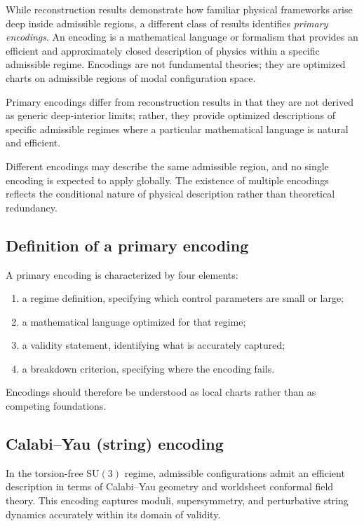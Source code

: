 \documentclass[11pt]{article}
\begin{document}
While reconstruction results demonstrate how familiar physical frameworks arise deep inside admissible regions, a different class of results identifies \emph{primary encodings}. An encoding is a mathematical language or formalism that provides an efficient and approximately closed description of physics within a specific admissible regime. Encodings are not fundamental theories; they are optimized charts on admissible regions of modal configuration space.

Primary encodings differ from reconstruction results in that they are not derived as generic deep-interior limits;
rather, they provide optimized descriptions of specific admissible regimes where a particular mathematical language
is natural and efficient.


Different encodings may describe the same admissible region, and no single encoding is expected to apply globally. The existence of multiple encodings reflects the conditional nature of physical description rather than theoretical redundancy.

\subsection{Definition of a primary encoding}

A primary encoding is characterized by four elements:
\begin{enumerate}
\item a regime definition, specifying which control parameters are small or large;
\item a mathematical language optimized for that regime;
\item a validity statement, identifying what is accurately captured;
\item a breakdown criterion, specifying where the encoding fails.
\end{enumerate}

Encodings should therefore be understood as local charts rather than as competing foundations.

\subsection{Calabi--Yau (string) encoding}

In the torsion-free $\mathrm{SU}(3)$ regime, admissible configurations admit an efficient description in terms of Calabi--Yau geometry and worldsheet conformal field theory. This encoding captures moduli, supersymmetry, and perturbative string dynamics accurately within its domain of validity.
\end{document}
